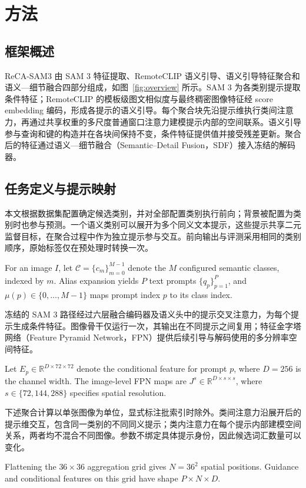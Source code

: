 \section{方法}
\subsection{框架概述}
ReCA-SAM3 由 SAM 3 特征提取、RemoteCLIP 语义引导、语义引导特征聚合和语义—细节融合四部分组成，如图~\ref{fig:overview} 所示。SAM 3 为各类别提示提取条件特征；RemoteCLIP 的模板级图文相似度与最终稠密图像特征经 score embedding 编码，形成各提示的语义引导。每个聚合块先沿提示维执行类间注意力，再通过共享权重的多尺度普通窗口注意力建模提示内部的空间联系。语义引导参与查询和键的构造并在各块间保持不变，条件特征提供值并接受残差更新。聚合后的特征通过语义—细节融合（Semantic--Detail Fusion，SDF）接入冻结的解码器。



\subsection{任务定义与提示映射}
本文根据数据集配置确定候选类别，并对全部配置类别执行前向；背景被配置为类别时也参与预测。一个语义类别可以展开为多个同义文本提示，这些提示共享二元监督目标，在聚合过程中作为独立提示参与交互。前向输出与评测采用相同的类别顺序，原始标签仅在预处理时转换一次。

For an image $I$, let $\mathcal C=\{c_m\}_{m=0}^{M-1}$ denote the $M$ configured semantic classes, indexed by $m$. Alias expansion yields $P$ text prompts $\{q_p\}_{p=1}^{P}$, and $\mu(p)\in\{0,\ldots,M-1\}$ maps prompt index $p$ to its class index.

冻结的 SAM 3 路径经过六层融合编码器及语义头中的提示交叉注意力，为每个提示生成条件特征。图像骨干仅运行一次，其输出在不同提示之间复用；特征金字塔网络（Feature Pyramid Network，FPN）提供后续引导与解码使用的多分辨率空间特征。

Let $E_p\in\mathbb R^{D\times72\times72}$ denote the conditional feature for prompt $p$, where $D=256$ is the channel width. The image-level FPN maps are $J^s\in\mathbb R^{D\times s\times s}$, where $s\in\{72,144,288\}$ specifies spatial resolution.

下述聚合计算以单张图像为单位，显式标注批索引时除外。类间注意力沿展开后的提示维交互，包含同一类别的不同同义提示；类内注意力在每个提示内部建模空间关系，两者均不混合不同图像。参数不绑定具体提示身份，因此候选词汇数量可以变化。

Flattening the $36\times36$ aggregation grid gives $N=36^2$ spatial positions. Guidance and conditional features on this grid have shape $P\times N\times D$.

